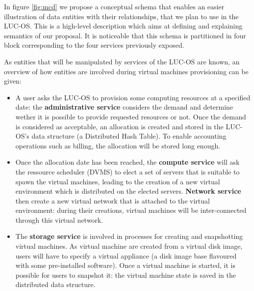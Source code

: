 In figure \ref{fig:mcd} we propose a conceptual schema that enables an easier 
illustration of data entities with their relationships, that we plan to use in
the LUC-OS. This is a high-level description which aims at defining and 
explaining semantics of our proposal. It is noticeable that this schema is 
partitioned in four block corresponding to the four services previously exposed.

As entities that will be manipulated by services of the LUC-OS are known, an
overview of how entities are involved during virtual machines provisioning can
be given:

\begin{itemize}

	\item A user asks the LUC-OS to provision some computing resources at a 
	specified date:  the \textbf{administrative service} considers the demand 
	and determine  wether it is possible to provide requested resources or not. 
	Once the demand is considered as acceptable, an allocation is created and 
	stored in the  LUC-OS's data structure (a Distributed Hash Table). To enable
	accounting operations such as billing, the allocation will be stored long
	enough.

	\item Once the allocation date has been reached, the \textbf{compute
	service} will ask the ressource scheduler (DVMS) to elect a 
	set of servers that is suitable to spawn the virtual machines, leading to 
	the creation of a new virtual environment which is distributed on the 
	elected servers. \textbf{Network service} then create a new virtual	network
	that is attached to the virtual	environment: during their creations, virtual
	machines will be inter-connected through this virtual network.

	\item The \textbf{storage service} is involved in processes for creating and 
	snapshotting virtual machines. As virtual machine are created from a virtual
	disk image, users will have to specify a virtual appliance (a disk image 
	base flavoured with some pre-installed software). Once a virtual machine is 
	started, it is possible for users to snapshot it: the virtual machine state
	is saved in the distributed data structure.

\end{itemize}